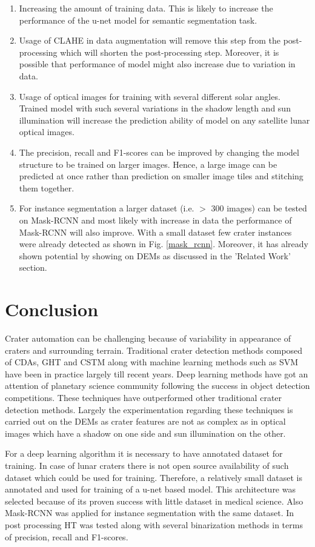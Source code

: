 \documentclass[11pt]{article}
\begin{document}
\begin{enumerate}
\item Increasing the amount of training data. This is likely to increase the performance of the u-net model for semantic segmentation task.
\item Usage of CLAHE in data augmentation will remove this step from the post-processing which will shorten the post-processing step. Moreover, it is possible that performance of model might also increase due to variation in data.
\item Usage of optical images for training with several different solar angles. Trained model with such several variations in the shadow length and sun illumination will increase the prediction ability of model on any satellite lunar optical images.
\item The precision, recall and F1-scores can be improved by changing the model structure to be trained on larger images. Hence, a large image can be predicted at once rather than prediction on smaller image tiles and stitching them together.
\item For instance segmentation a larger dataset (i.e. $>$ 300 images) can be tested on Mask-RCNN and most likely with increase in data the performance of Mask-RCNN will also improve. With a small dataset few crater instances were already detected as shown in Fig. \ref{mask_rcnn}. Moreover, it has already shown potential by showing  on DEMs as discussed in the 'Related Work' section.
\end{enumerate}

\newpage
\section{Conclusion}
Crater automation can be challenging because of variability in appearance of craters and surrounding terrain. Traditional crater detection methods composed of CDAs, GHT and CSTM along with machine learning methods such as SVM have been in practice largely till recent years. Deep learning methods have got an attention of planetary science community following the success in object detection competitions. These techniques have outperformed other traditional crater detection methods. Largely the experimentation regarding these techniques is carried out on the DEMs as crater features are not as complex as in optical images which have a shadow on one side and sun illumination on the other.

For a deep learning algorithm it is necessary to have annotated dataset for training. In case of lunar craters there is not open source availability of such dataset which could be used for training. Therefore, a relatively small dataset is annotated and used for training of a u-net based model. This architecture was selected because of its proven success with little dataset in medical science. Also Mask-RCNN was applied for instance segmentation with the same dataset. In post processing HT was tested along with several binarization methods in terms of precision, recall and F1-scores.
\end{document}
